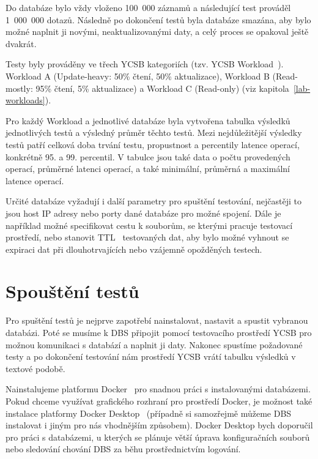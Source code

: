 \documentclass[czech,master,dept460,male,csharp,cpdeclaration]{diploma}
\begin{document}
	Do databáze bylo vždy vloženo 100~000 záznamů a následující test prováděl 1~000~000 dotazů. Následně po dokončení testů byla databáze smazána, aby bylo možné naplnit ji novými, neaktualizovanými daty, a celý proces se opakoval ještě dvakrát.
	
	Testy byly prováděny ve třech YCSB kategoriích (tzv. YCSB Workload~\cite{workloads}). Workload A (Update-heavy: 50\% čtení, 50\% aktualizace), Workload B (Read-mostly: 95\% čtení, 5\% aktualizace) a Workload C (Read-only) (viz kapitola~\ref{lab-workloads}).
	
	Pro každý Workload a jednotlivé databáze byla vytvořena tabulka výsledků jednotlivých testů a výsledný průměr těchto testů. Mezi nejdůležitější výsledky testů patří celková doba trvání testu, propustnost a percentily latence operací, konkrétně 95. a 99. percentil. V tabulce jsou také data o počtu provedených operací, průměrné latenci operací, a také minimální, průměrná a maximální latence operací.
	
	Určité databáze vyžadují i další parametry pro spuštění testování, nejčastěji to jsou host IP adresy nebo porty dané databáze pro možné spojení. Dále je například možné specifikovat cestu k souborům, se kterými pracuje testovací prostředí, nebo stanovit TTL~\cite{ttl} testovaných dat, aby bylo možné vyhnout se expiraci dat při dlouhotrvajících nebo vzájemně opožděných testech.
	
	\section{Spouštění testů}\label{test-start}
	
	Pro spuštění testů je nejprve zapotřebí nainstalovat, nastavit a spustit vybranou databázi. Poté se musíme k DBS připojit pomocí testovacího prostředí YCSB pro možnou komunikaci s databází a naplnit ji daty. Nakonec spustíme požadované testy a po dokončení testování nám prostředí YCSB vrátí tabulku výsledků v textové podobě.
	
	Nainstalujeme platformu Docker~\cite{docker-console} pro snadnou práci s instalovanými databázemi. Pokud chceme využívat grafického rozhraní pro prostředí Docker, je možnost také instalace platformy Docker Desktop~\cite{docker-desktop, docker-cli} (případně si samozřejmě můžeme DBS instalovat i jiným pro nás vhodnějším způsobem). Docker Desktop bych doporučil pro práci s databázemi, u kterých se plánuje větší úprava konfiguračních souborů nebo sledování chování DBS za běhu prostřednictvím logování.
	
\end{document}
